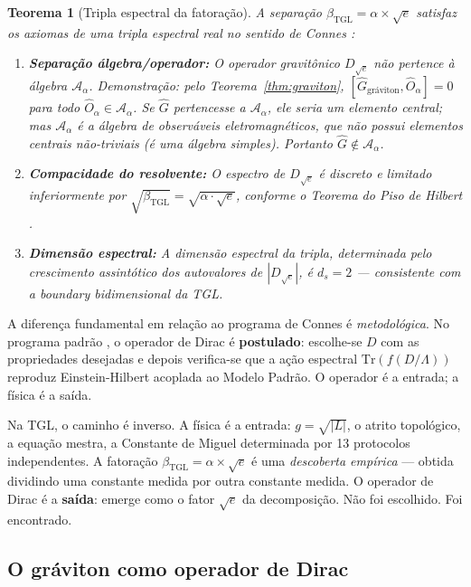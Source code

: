 \documentclass[12pt,a4paper,twoside]{article}
\newtheorem{theorem}{Teorema}[section]
\newcommand{\betatgl}{\beta_{\!\scriptscriptstyle\mathrm{TGL}}}
\newcommand{\boundary}{\textit{boundary}}
\begin{document}
\begin{theorem}[Tripla espectral da fatoração]
\label{thm:tripla}
A separação $\betatgl = \alpha \times \sqrt{e}$ satisfaz os axiomas de uma tripla espectral real no sentido de Connes \cite{Connes1996}:
\begin{enumerate}[nosep]
\item \textbf{Separação álgebra/operador:} O operador gravitônico $D_{\sqrt{e}}$ não pertence à álgebra $\mathcal{A}_\alpha$. Demonstração: pelo Teorema~\ref{thm:graviton}, $[\hat{G}_{\text{gráviton}}, \hat{O}_\alpha] = 0$ para todo $\hat{O}_\alpha \in \mathcal{A}_\alpha$. Se $\hat{G}$ pertencesse a $\mathcal{A}_\alpha$, ele seria um elemento central; mas $\mathcal{A}_\alpha$ é a álgebra de observáveis eletromagnéticos, que não possui elementos centrais não-triviais (é uma álgebra simples). Portanto $\hat{G} \notin \mathcal{A}_\alpha$.
\item \textbf{Compacidade do resolvente:} O espectro de $D_{\sqrt{e}}$ é discreto e limitado inferiormente por $\sqrt{\betatgl} = \sqrt{\alpha \cdot \sqrt{e}}$, conforme o Teorema do Piso de Hilbert \cite{Miguel2026Graviton}.
\item \textbf{Dimensão espectral:} A dimensão espectral da tripla, determinada pelo crescimento assintótico dos autovalores de $|D_{\sqrt{e}}|$, é $d_s = 2$ --- consistente com a \boundary{} bidimensional da TGL.
\end{enumerate}
\end{theorem}

A diferença fundamental em relação ao programa de Connes é \textit{metodológica}. No programa padrão \cite{Connes1996, Chamseddine1997}, o operador de Dirac é \textbf{postulado}: escolhe-se $D$ com as propriedades desejadas e depois verifica-se que a ação espectral $\text{Tr}(f(D/\Lambda))$ reproduz Einstein-Hilbert acoplada ao Modelo Padrão. O operador é a entrada; a física é a saída.

Na TGL, o caminho é inverso. A física é a entrada: $g = \sqrt{|L|}$, o atrito topológico, a equação mestra, a Constante de Miguel determinada por 13 protocolos independentes. A fatoração $\betatgl = \alpha \times \sqrt{e}$ é uma \textit{descoberta empírica} --- obtida dividindo uma constante medida por outra constante medida. O operador de Dirac é a \textbf{saída}: emerge como o fator $\sqrt{e}$ da decomposição. Não foi escolhido. Foi encontrado.


\subsection{O gráviton como operador de Dirac}
\label{subsec:dirac}
\end{document}
